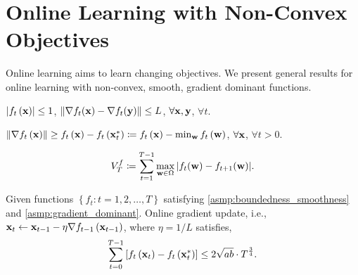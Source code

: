 \section{Online Learning with Non-Convex Objectives}

Online learning aims to learn changing objectives. We present general results for online learning with non-convex, smooth, gradient dominant functions.

\begin{asmp}
\label{asmp:boundedness_smoothness}
$\left| f_t\left({\mathbf{x}}\right) \right| \le 1$, $\left\| \nabla f_t({\mathbf{x}} ) - \nabla f_t({\mathbf{y}}) \right\| \le L $, $\forall {\mathbf{x}}, {\mathbf{y}}$, $\forall t$.
\end{asmp}

\begin{asmp}
\label{asmp:gradient_dominant}
$\left\| \nabla f_t\left({\mathbf{x}}\right) \right\| \ge f_t\left({\mathbf{x}}\right) - f_t\left({\mathbf{x}}_t^*\right) \coloneqq f_t\left({\mathbf{x}}\right) - \min_{{\mathbf{w}}}{ f_t\left({\mathbf{w}} \right)}$, $\forall {\mathbf{x}}$, $\forall t > 0$.
\end{asmp}

\begin{defi}
\begin{equation*}
\begin{split}
    V_{T}^{f} \coloneqq \sum\limits_{t=1}^{T-1}{\max\limits_{{\mathbf{w}} \in \Omega}{\left| f_{t}({\mathbf{w}}) - f_{t+1}({\mathbf{w}}) \right| } }.
\end{split}
\end{equation*}
\end{defi}

\begin{thm}
\label{thm:online_learning_regret}
Given functions $\left\{ f_t : t = 1, 2, \dots, T \right\}$ satisfying \cref{asmp:boundedness_smoothness} and \cref{asmp:gradient_dominant}. Online gradient update, i.e., ${\mathbf{x}}_{t} \gets {\mathbf{x}}_{t-1} - \eta \nabla f_{t-1}\left({\mathbf{x}}_{t-1}\right)$, where $\eta = 1/L$ satisfies,
\begin{equation*}
\begin{split}
    \sum\limits_{t=0}^{T-1}{\left[ f_t\left({\mathbf{x}}_t\right) - f_t\left( {\mathbf{x}}_t^* \right) \right]} \le 2 \sqrt{ab} \cdot T^{\frac{3}{4}}.
\end{split}
\end{equation*}
\end{thm}


